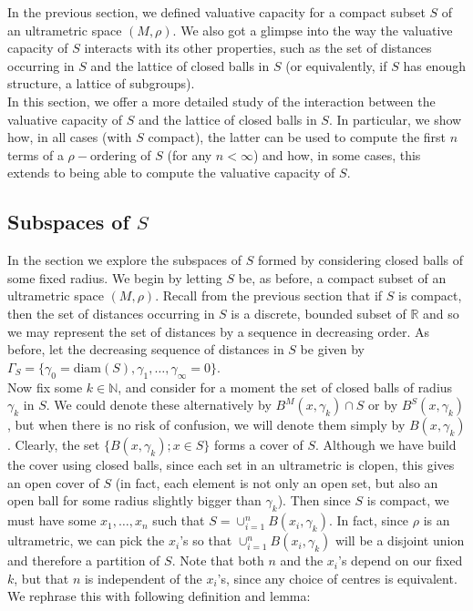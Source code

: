 
In the previous section, we defined valuative capacity for a compact subset $S$ of an ultrametric space $(M, \rho)$. We also got a glimpse into the way the valuative capacity of $S$ interacts with its other properties, such as the set of distances occurring in $S$ and the lattice of closed balls in $S$ (or equivalently, if $S$ has enough structure, a lattice of subgroups).\\

In this section, we offer a more detailed study of the interaction between the valuative capacity of $S$ and the lattice of closed balls in $S$. In particular, we  show how, in all cases (with $S$ compact), the latter can be used to compute the first $n$ terms of a $\rho-$ordering of $S$ (for any $n < \infty$) and how, in some cases, this extends to being able to compute the valuative capacity of $S$.\\

\subsection*{Subspaces of $S$}
In the section we explore the subspaces of $S$ formed by considering closed balls of some fixed radius. We begin by letting $S$ be, as before,  a compact subset of an ultrametric space $(M, \rho)$.  Recall from the previous section that if $S$ is compact, then the set of distances occurring in $S$ is a discrete, bounded subset of $\mathbb{R}$ and so we may represent the set of distances by a sequence in decreasing order. As before, let the decreasing sequence of distances in $S$ be given by  $\Gamma_S =\{\gamma_0=\text{diam}(S), \gamma_1,\ldots,\gamma_\infty=0\}$.\\

 Now fix some $k \in \mathbb{N}$, and consider for a moment the set of closed balls of radius $\gamma_k$ in $S$. We could denote these alternatively by $B^M(x, \gamma_k) \cap S$ or by  $B^S(x, \gamma_k)$, but when there is no risk of confusion, we will denote them simply by $B(x, \gamma_k)$. Clearly, the set  $\{B(x, \gamma_k); x \in S\}$ forms a cover of $S$. Although we have build the cover using closed balls, since each set in an ultrametric is clopen, this gives an open cover of $S$ (in fact, each element is not only an open set, but also an open ball for some radius slightly bigger than $\gamma_k$). Then since $S$ is compact, we must have some $x_1,\ldots, x_n$  such that $S= \cup_{i=1}^n B(x_i, \gamma_k)$. In fact,  since $\rho$ is an ultrametric, we can pick the $x_i$'s so that $\cup_{i=1}^n B(x_i, \gamma_k)$ will be a disjoint union and therefore a partition of $S$. Note that both $n$ and the $x_i$'s depend on our fixed $k$, but that $n$ is independent of the $x_i$'s, since any choice of centres is equivalent. We rephrase this with following definition and lemma:

